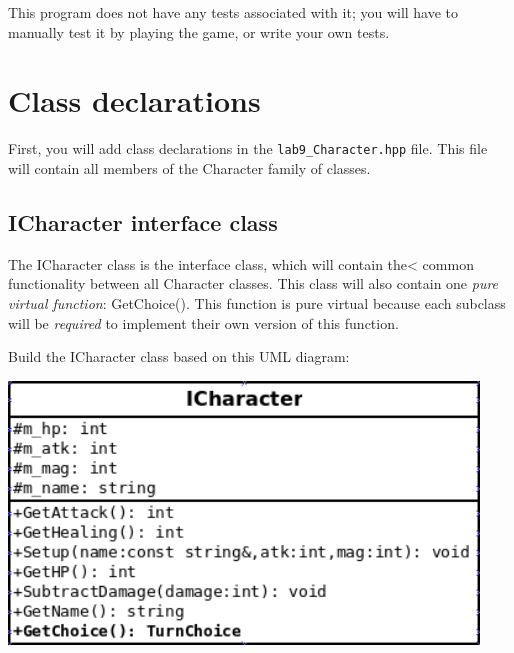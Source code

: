 \documentclass[a4paper,12pt,oneside]{book}
\begin{document}
This program does not have any tests associated with it; you will have to
manually test it by playing the game, or write your own tests.

    \tableofcontents


    \newpage{}

    \section{Class declarations}

    First, you will add class declarations in the \texttt{lab9\_Character.hpp}
    file. This file will contain all members of the Character family of classes.

    \subsection{ICharacter interface class}

    The ICharacter class is the interface class, which will contain
    the< common functionality between all Character classes. This class
    will also contain one \textit{pure virtual function}: GetChoice().
    This function is pure virtual because each subclass will be
    \textit{required} to implement their own version of this function.

    Build the ICharacter class based on this UML diagram:

    \begin{center}
        \includegraphics[height=7cm]{images/lab9-icharacter.png}
    \end{center}
\end{document}
